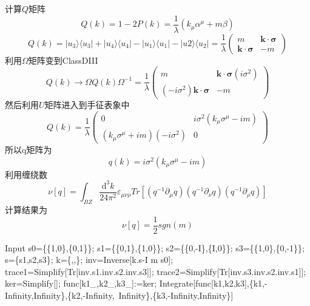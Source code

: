 \documentclass{article}
\numberwithin{equation}{subsection}
\begin{document}
计算$Q$矩阵
\begin{equation}
    Q(k)=1-2P(k)=\frac{1}{\lambda}(k_\mu\alpha^\mu+m\beta)
\end{equation}
\begin{equation}
    Q(k)=|u_3\rangle\langle u_3|+|u_4\rangle\langle u_4|-|u_1\rangle\langle u_1|-|u2\rangle\langle u_2|=\frac{1}{\lambda}\begin{pmatrix}
        m&\bm{k}\cdot\bm{\sigma}\\
        \bm{k}\cdot\bm{\sigma}&-m
    \end{pmatrix}
\end{equation}
利用$\Omega$矩阵变到ClassDIII
\begin{equation}
    Q(k)\rightarrow\Omega Q(k)\Omega^{-1}=\frac{1}{\lambda}\begin{pmatrix}
        m&\bm{k}\cdot\bm{\sigma}(i\sigma^2)\\
        (-i\sigma^2)\bm{k}\cdot\bm{\sigma}&-m
    \end{pmatrix}
\end{equation}
然后利用$U$矩阵进入到手征表象中
\begin{equation}
    Q(k)=\frac{1}{\lambda}\begin{pmatrix}
        0&i\sigma^2(k_\mu\sigma^\mu-im)\\
        (k_\mu\sigma^\mu+im)(-i\sigma^2)&0
    \end{pmatrix}
\end{equation}
所以q矩阵为
\begin{equation}
    q(k)=i\sigma^2(k_\mu\sigma^\mu-im)
\end{equation}
利用缠绕数
\begin{equation}
    \nu[q]=\int_{BZ}\frac{\mathrm{d}^3k}{24\pi^2}\varepsilon_{\mu\nu\rho}Tr[(q^{-1}\partial_\mu q)(q^{-1}\partial_\nu q)(q^{-1}\partial_\rho q)]
\end{equation}
计算结果为
\begin{equation}
    \nu[q]=\frac{1}{2}sgn(m)
\end{equation}
\begin{mmaCell}[moredefined={s0, s1, s2, s3, s, k, inv, trace1, \
    trace2, ker, func},morefunctionlocal={k1, k2, k3},morepattern={k1_, \
    k2_, k3_}]{Input}
s0=\{\{1,0\},\{0,1\}\};
s1=\{\{0,1\},\{1,0\}\};
s2=\{\{0,-I\},\{I,0\}\};
s3=\{\{1,0\},\{0,-1\}\};
s=\{s1,s2,s3\};
k=\{,,\};
inv=Inverse[k.s-I m s0];
trace1=Simplify[Tr[inv.s1.inv.s2.inv.s3]];
trace2=Simplify[Tr[inv.s3.inv.s2.inv.s1]];
ker=Simplify[];
func[k1_,k2_,k3_]:=ker;
Integrate[func[k1,k2,k3],\{k1,-Infinity,Infinity\},\{k2,-Infinity,\
Infinity\},\{k3,-Infinity,Infinity\}]
\end{mmaCell}
\end{document}
